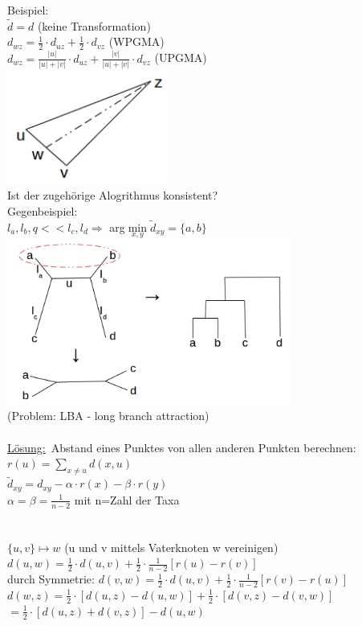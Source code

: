 Beispiel:\\
$\tilde d = d$ (keine Transformation)\\
$d_{wz}=\frac{1}{2} \cdot d_{uz} + \frac{1}{2} \cdot d_{vz}$ (WPGMA)\\
$d_{wz}=\frac{|u|}{|u| + |v|} \cdot d_{uz} + \frac{|v|}{|u| + |v|} \cdot d_{vz}$ (UPGMA)\\
\includegraphics[width=0.4\textwidth]{lectures/161221/pix/2.jpg}\\
Ist der zugehörige Alogrithmus konsistent?\\
Gegenbeispiel:\\
$l_a,l_b,q << l_c,l_d \Rightarrow $ arg$\min \limits_{x,y} \tilde d_{xy}=\{a,b\}$\\
\includegraphics[width=0.7\textwidth]{lectures/161221/pix/3.jpg}\\
(Problem: LBA - long branch attraction)\\\\
\underline{Lösung:}\
Abstand eines Punktes von allen anderen Punkten berechnen:$r(u)=\displaystyle \sum_{x \neq u}d(x,u)$\\
$\tilde d_{xy}=d_{xy}-\alpha \cdot r(x) - \beta \cdot r(y)$\\
$\alpha = \beta = \frac{1}{n-2}$ mit n=Zahl der Taxa\\

\\\\
$\{u,v\} \mapsto w$ (u und v mittels Vaterknoten w vereinigen)\\
$d(u,w)=\frac{1}{2} \cdot d(u,v) + \frac{1}{2} \cdot \frac{1}{n-2}[r(u)-r(v)]$\\
durch Symmetrie:
$d(v,w)=\frac{1}{2} \cdot d(u,v) + \frac{1}{2} \cdot \frac{1}{n-2}[r(v)-r(u)]$\\
$d(w,z)=\frac{1}{2} \cdot [d(u,z) - d(u,w)] + \frac{1}{2} \cdot [d(v,z)-d(v,w)]$\\
$=\frac{1}{2} \cdot [d(u,z) + d(v,z)] - d(u,w)$\\

